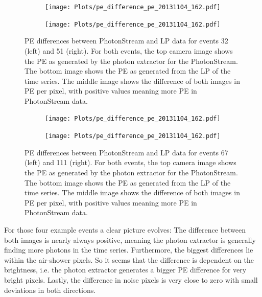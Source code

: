 \begin{figure}
  \begin{subfigure}{0.5\textwidth}
    \centering
    \texttt{[image: Plots/pe\_difference\_pe\_20131104\_162.pdf]}
  \end{subfigure}
  \begin{subfigure}{0.5\textwidth}
    \centering
    \texttt{[image: Plots/pe\_difference\_pe\_20131104\_162.pdf]}
  \end{subfigure}
  \caption{PE differences between PhotonStream and LP data for events 32 (left) and 51 (right). For both events, the top camera image
  shows the PE as generated by the photon extractor for the PhotonStream. The
  bottom image shows the PE as generated from the LP of the time series. The
  middle image shows the difference of both images in PE per pixel, with
  positive values meaning more PE in PhotonStream data.}
  \label{fig:difference}
\end{figure}
%
%
\begin{figure}
  \begin{subfigure}{0.5\textwidth}
    \centering
    \texttt{[image: Plots/pe\_difference\_pe\_20131104\_162.pdf]}
  \end{subfigure}
  \begin{subfigure}{0.5\textwidth}
    \centering
    \texttt{[image: Plots/pe\_difference\_pe\_20131104\_162.pdf]}
  \end{subfigure}
  \caption{PE differences between PhotonStream and LP data for events 67 (left) and 111 (right). For both events, the top camera image
  shows the PE as generated by the photon extractor for the PhotonStream. The
  bottom image shows the PE as generated from the LP of the time series. The
  middle image shows the difference of both images in PE per pixel, with
  positive values meaning more PE in PhotonStream data.}
  \label{fig:difference2}
\end{figure}
%

For those four example events a clear picture evolves: The difference between
both images is nearly always positive, meaning the photon extractor is
generally finding more photons in the time series. Furthermore, the biggest
differences lie within the air-shower pixels. So it seems that the difference
is dependent on the brightness, i.e. the photon extractor generates a bigger
PE difference for very bright pixels. Lastly, the difference in noise pixels is
very close to zero with small deviations in both directions.

